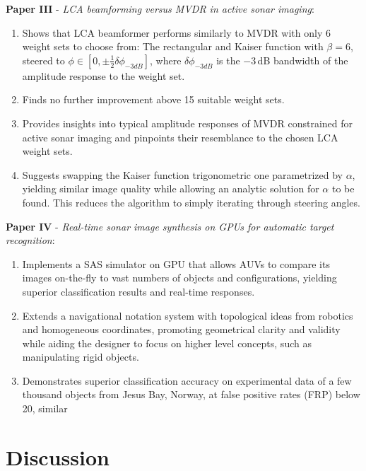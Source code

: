 \textbf{Paper III} - \textit{LCA beamforming versus MVDR in active sonar imaging}:
\begin{enumerate}
\item Shows that LCA beamformer performs similarly to MVDR with only 6 weight sets to choose from: The rectangular and Kaiser function with $\beta=6$, steered to $\phi\in[0,\pm\frac{1}{2}\delta{\phi_{-3dB}}]$, where $\delta{\phi_{-3dB}}$ is the $-3$\,dB bandwidth of the amplitude response to the weight set.
\item Finds no further improvement above 15 suitable weight sets.
\item Provides insights into typical amplitude responses of MVDR constrained for active sonar imaging and pinpoints their resemblance to the chosen LCA weight sets. 
\item Suggests swapping the Kaiser function trigonometric one parametrized by $\alpha$, yielding similar image quality while allowing an analytic solution for $\alpha$ to be found. This reduces the algorithm to simply iterating through steering angles.
\end{enumerate}

\textbf{Paper IV} - \textit{Real-time sonar image synthesis on GPUs for automatic target recognition}:
\begin{enumerate}
\item Implements a SAS simulator on GPU that allows AUVs to compare its images on-the-fly to vast numbers of objects and configurations, yielding superior classification results and real-time responses.
\item Extends a navigational notation system with topological ideas from robotics and homogeneous coordinates, promoting geometrical clarity and validity while aiding the designer to focus on higher level concepts, such as manipulating rigid objects.
\item Demonstrates superior classification accuracy on experimental data of a few thousand objects from Jesus Bay, Norway, at false positive rates (FRP) below 20, similar %
\end{enumerate}

\section{Discussion}

